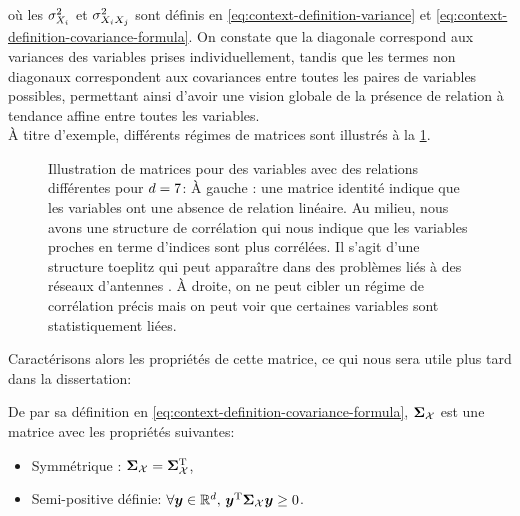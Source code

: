 où les $\sigma^2_{X_i}$ et
$\sigma^2_{X_iX_j}$ sont définis en
\cref{eq:context-definition-variance} et
\cref{eq:context-definition-covariance-formula}.
On constate que la diagonale correspond aux variances des variables
prises individuellement, tandis que les termes non diagonaux
correspondent aux covariances entre toutes les paires de variables
possibles, permettant ainsi d'avoir une vision globale de la présence de relation à tendance affine entre toutes les variables. \\


\`A titre d'exemple, différents régimes de matrices sont illustrés à la \cref{fig:context-covariance-regimes}.

\begin{figure}[h]
  \centering
  
  \provCovmatexamplesQR[1cm]
  \caption{Illustration de matrices pour des variables avec des relations différentes pour $d=7$: À gauche : une matrice identité indique que les variables ont une absence de relation linéaire. Au milieu, nous avons une structure de corrélation qui nous indique que les variables proches en terme d'indices sont plus corrélées. Il s'agit d'une structure toeplitz qui peut apparaître dans des problèmes liés à des réseaux d'antennes . À droite, on ne peut cibler un régime de corrélation précis mais on peut voir que certaines variables sont statistiquement liées. \provCovmatexamples}
  \label{fig:context-covariance-regimes}
\end{figure}


Caractérisons alors les propriétés de cette matrice, ce qui nous sera utile plus tard dans la dissertation:

\begin{property}[{SPD}]
\label{prop:context-prop-covariance}
  De par sa définition en \cref{eq:context-definition-covariance-formula}, $\boldsymbol{\Sigma}_{\mathcal{X}}$ est une matrice avec les propriétés suivantes:
  \begin{itemize}
    \item Symmétrique : $\boldsymbol{\Sigma}_{\mathcal{X}}=\boldsymbol{\Sigma}_{\mathcal{X}}^{\mathrm{T}}$,
    \item Semi-positive définie: $\forall \boldsymbol{y}\in\mathbb{R}^d,\, \boldsymbol{y}^{\mathrm{T}}\boldsymbol{\Sigma}_{\mathcal{X}}\boldsymbol{y}\geq 0$.
  \end{itemize}
\end{property}


